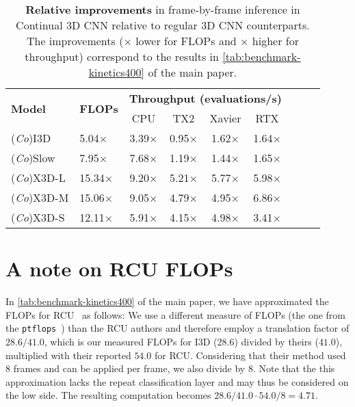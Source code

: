 \begin{table}
\begin{center}
\begin{tabular}{llccccccc}
    \toprule
    \multirow{2}{*}{\textbf{Model}} 
    &\multirow{2}{*}{\textbf{FLOPs}}  
    &\multicolumn{4}{c}{\textbf{Throughput (evaluations/s)}}
        \\ \cline{3-6}
        &&CPU & TX2  &Xavier &RTX
    \\
    \midrule             %
    (\textit{Co})I3D     &5.04$\times$   & 3.39$\times$  & 0.95$\times$  & 1.62$\times$  & 1.64$\times$ \\
    (\textit{Co})Slow    &7.95$\times$   & 7.68$\times$  & 1.19$\times$  & 1.44$\times$  & 1.65$\times$ \\
    (\textit{Co})X3D-L   &15.34$\times$  & 9.20$\times$  & 5.21$\times$  & 5.77$\times$  & 5.98$\times$ \\
    (\textit{Co})X3D-M   &15.06$\times$  & 9.05$\times$  & 4.79$\times$  & 4.95$\times$  & 6.86$\times$ \\
    (\textit{Co})X3D-S   &12.11$\times$  & 5.91$\times$  & 4.15$\times$  & 4.98$\times$  & 3.41$\times$ \\
    \bottomrule
\end{tabular}
\end{center}
\caption{\textbf{Relative improvements} in frame-by-frame inference in Continual 3D CNN relative to regular 3D CNN counterparts. The improvements ($\times$ lower for FLOPs and $\times$ higher for throughput) correspond to the results in \cref{tab:benchmark-kinetics400} of the main paper.}
\label{tab:relative-results}
\end{table}


\section{A note on RCU FLOPs} \label{apx:rcu}
In \cref{tab:benchmark-kinetics400} of the main paper, we have approximated the FLOPs for RCU~\cite{singh2019recurrent} as follows:
We use a different measure of FLOPs (the one from the \texttt{ptflops}~\cite{sovrasov2020ptflops}) than the RCU authors and therefore employ a translation factor of $28.6 / 41.0$, which is our measured FLOPs for I3D ($28.6$) divided by theirs ($41.0$), multiplied with their reported $54.0$ for RCU. Considering that their method used 8 frames and can be applied per frame, we also divide by 8. 
Note that the this approximation lacks the repeat classification layer and may thus be considered on the low side. The resulting computation becomes 
$28.6 / 41.0 \cdot 54.0 / 8 = 4.71$. 



